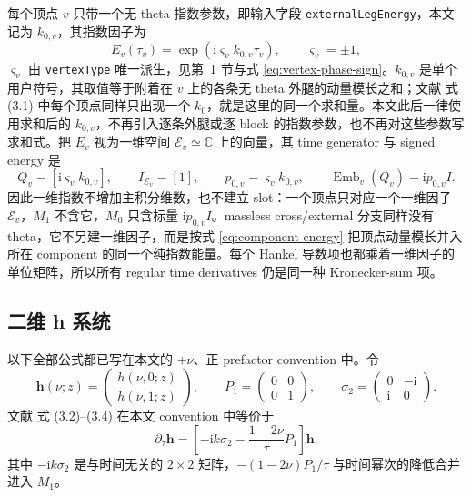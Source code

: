 \documentclass[11pt,a4paper]{ctexart}
\newcommand{\ii}{\mathrm i}
\newcommand{\cE}{\mathcal E}
\newcommand{\Emb}{\operatorname{Emb}}
\begin{document}
每个顶点 $v$ 只带一个无 theta 指数参数，即输入字段 \texttt{externalLegEnergy}，本文记为 $k_{0,v}$，其指数因子为
\begin{equation}
 E_v(\tau_v)
 =\exp\!\left(\ii\varsigma_vk_{0,v}\tau_v\right),
 \qquad \varsigma_v=\pm1,
 \label{eq:phase-exponent-block}
\end{equation}
$\varsigma_v$ 由 \texttt{vertexType} 唯一派生，见第~1 节与式 \eqref{eq:vertex-phase-sign}。$k_{0,v}$ 是单个用户符号，其取值等于附着在 $v$ 上的各条无 theta 外腿的动量模长之和；文献 \cite{Chen:2023eic} 式 (3.1) 中每个顶点同样只出现一个 $k_0$，就是这里的同一个求和量。本文此后一律使用求和后的 $k_{0,v}$，不再引入逐条外腿或逐 block 的指数参数，也不再对这些参数写求和式。把 $E_v$ 视为一维空间 $\cE_v\simeq\mathbb C$ 上的向量，其 time generator 与 signed energy 是
\begin{equation}
 Q_v=[\ii\varsigma_vk_{0,v}],
 \qquad I_{\cE_v}=[1],
 \qquad p_{0,v}=\varsigma_vk_{0,v},
 \qquad \Emb_v(Q_v)=\ii p_{0,v}I.
 \label{eq:exponential-1d}
\end{equation}
因此一维指数不增加主积分维数，也不建立 slot：一个顶点只对应一个一维因子 $\cE_v$，$M_1$ 不含它，$M_0$ 只含标量 $\ii p_{0,v}I$。massless cross/external 分支同样没有 theta，它不另建一维因子，而是按式 \eqref{eq:component-energy} 把顶点动量模长并入所在 component 的同一个纯指数能量。每个 Hankel 导数项也都乘着一维因子的单位矩阵，所以所有 regular time derivatives 仍是同一种 Kronecker-sum 项。

\subsection{二维 h 系统}

以下全部公式都已写在本文的 $+\nu$、正 prefactor convention 中。令
\begin{equation}
 \bm h(\nu;z)=
 \begin{pmatrix}h(\nu,0;z)\\h(\nu,1;z)\end{pmatrix},
 \qquad
 P_1=\begin{pmatrix}0&0\\0&1\end{pmatrix},
 \qquad
 \sigma_2=\begin{pmatrix}0&-\ii\\ \ii&0\end{pmatrix}.
\end{equation}
文献 \cite{Chen:2023eic} 式 (3.2)--(3.4) 在本文 convention 中等价于
\begin{equation}
 \partial_\tau\bm h
 =\left[-\ii k\sigma_2-\frac{1-2\nu}{\tau}P_1\right]\bm h.
 \label{eq:h-first-order-system}
\end{equation}
其中 $-\ii k\sigma_2$ 是与时间无关的 $2\times2$ 矩阵，$-(1-2\nu)P_1/\tau$ 与时间幂次的降低合并进入 $M_1$。
\end{document}
